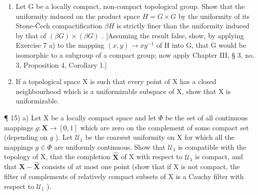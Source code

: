 \begin{enumerate}
\def\labelenumi{\arabic{enumi})}
\setcounter{enumi}{12}
\item
  Let G be a locally compact, non-compact topological group. Show that the uniformity induced on the product space \(H = G \times G\) by the uniformity of its Stone-Čech compactification \(\beta H\) is strictly finer than the uniformity induced by that of \((\beta G) \times (\beta G)\) . {[}Assuming the result false, show, by applying Exercise 7 a) to the mapping \((x, y) \to xy^{-1}\) of H into G, that G would be isomorphic to a subgroup of a compact group; now apply Chapter III, § 3, no. 3, Proposition 4, Corollary 1.{]}
\item
  If a topological space X is such that every point of X has a closed neighbourhood which is a uniformizable subspace of X, show that X is uniformizable.
\end{enumerate}

¶ 15) a) Let X be a locally compact space and let \(\Phi\) be the set of all continuous mappings \(g: \mathbf{X} \to [\mathfrak{0}, \mathfrak{1}]\) which are zero on the complement of some compact set (depending on \(g\) ). Let \(\mathcal{U}_1\) be the coarsest uniformity on X for which all the mappings \(g \in \Phi\) are uniformly continuous. Show that \(\mathcal{U}_1\) is compatible with the topology of X, that the completion \(\hat{\mathbf{X}}\) of X with respect to \(\mathcal{U}_1\) is compact, and that \(\mathbf{X} - \hat{\mathbf{X}}\) consists of at most one point (show that if X is not compact, the filter of complements of relatively compact subsets of X is a Cauchy filter with respect to \(\mathcal{U}_1\) ).

